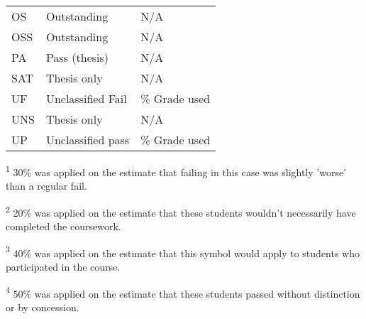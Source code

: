 \begin{table}[h]
\begin{threeparttable}
\begin{tabularx}{\textwidth}{>{\hsize=0.6\hsize}X>{\hsize=1.3\hsize}X>{\hsize=1.1\hsize}X}
            OS             & Outstanding              & N/A                                        \\
            OSS            & Outstanding              & N/A                                        \\
            PA             & Pass (thesis)            & N/A                                        \\
            SAT            & Thesis only              & N/A                                        \\
            UF             & Unclassified Fail        & 30\% Grade used\tnote{\textsuperscript{1}} \\
            UNS            & Thesis only              & N/A                                        \\
            UP             & Unclassified pass        & 50\% Grade used\tnote{\textsuperscript{4}} \\
            \bottomrule
        \end{tabularx}
        \scriptsize
        \begin{tablenotes}
            \item[\textsuperscript{1}]30\% was applied on the estimate that failing in this case was slightly 'worse' than a regular fail.
            \item[\textsuperscript{2}]20\% was applied on the estimate that these students wouldn't necessarily have completed the coursework.
            \item[\textsuperscript{3}]40\% was applied on the estimate that this symbol would apply to students who participated in the course.
            \item[\textsuperscript{4}]50\% was applied on the estimate that these students passed without distinction or by concession.
        \end{tablenotes}
    \end{threeparttable}
\end{table}